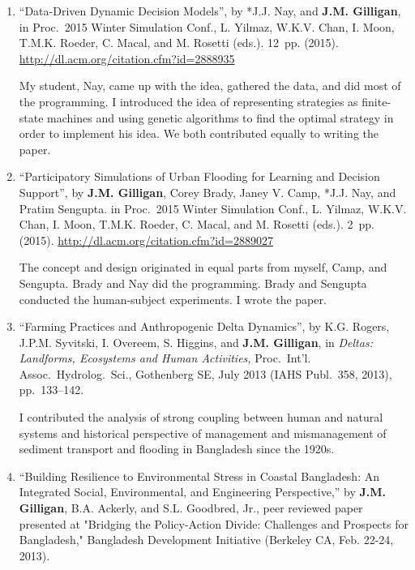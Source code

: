 %
%
\begin{enumerate}
%
	  \item 
	  \textdagger \enquote{Data-Driven Dynamic Decision Models}, 
	  by *J.J. Nay, and \textbf{J.M. Gilligan},
	  in Proc.\ 2015 Winter Simulation Conf., L. Yilmaz, W.K.V. Chan, I. Moon, T.M.K. Roeder, C. Macal, and M. Rosetti (eds.). 12~pp. (2015). \url{http://dl.acm.org/citation.cfm?id=2888935}
	  \begin{credit}
	  My student, Nay, came up with the idea, gathered the data, and did most of the programming. I introduced the idea of representing strategies as finite-state machines and using genetic algorithms to find the optimal strategy in order to implement his idea. We both contributed equally to writing the paper.
	  \end{credit}
%
	  \item 
	  \textdagger \enquote{Participatory Simulations of Urban Flooding for Learning and Decision Support}, 
	  by \textbf{J.M. Gilligan}, Corey Brady, Janey V. Camp, *J.J. Nay, and Pratim Sengupta.
	  in Proc.\ 2015 Winter Simulation Conf., L. Yilmaz, W.K.V. Chan, I. Moon, T.M.K. Roeder, C. Macal, and M. Rosetti (eds.). 2~pp. (2015). \url{http://dl.acm.org/citation.cfm?id=2889027}
	  \begin{credit}
	  The concept and design originated in equal parts from myself, Camp, and Sengupta. Brady and Nay did the programming. Brady and Sengupta conducted the human-subject experiments. I wrote the paper.
	  \end{credit}
%
	  \item 
	  \enquote{Farming Practices and Anthropogenic Delta Dynamics}, 
	  by K.G. Rogers, J.P.M. Syvitski, I. Overeem, S. Higgins, and \textbf{J.M. Gilligan},
	  in \emph{Deltas: Landforms, Ecosystems and Human Activities,} Proc.\ Int'l. Assoc.\ Hydrolog.\ Sci., Gothenberg SE, July 2013 (IAHS Publ.\ 358, 2013), pp.~133--142.
	  \begin{credit}
	  I contributed the analysis of strong coupling between human and natural systems and historical perspective of management and mismanagement of sediment transport and flooding in Bangladesh since the 1920s.
	  \end{credit}
%
	\item
	\enquote{Building Resilience to Environmental Stress in Coastal Bangladesh: An Integrated Social, Environmental, and Engineering Perspective,} by \textbf{J.M. Gilligan}, B.A. Ackerly, and S.L. Goodbred, Jr., peer reviewed paper presented at "Bridging the Policy-Action Divide: Challenges and Prospects for Bangladesh," Bangladesh Development Initiative (Berkeley CA, Feb. 22-24, 2013).

\end{enumerate}
